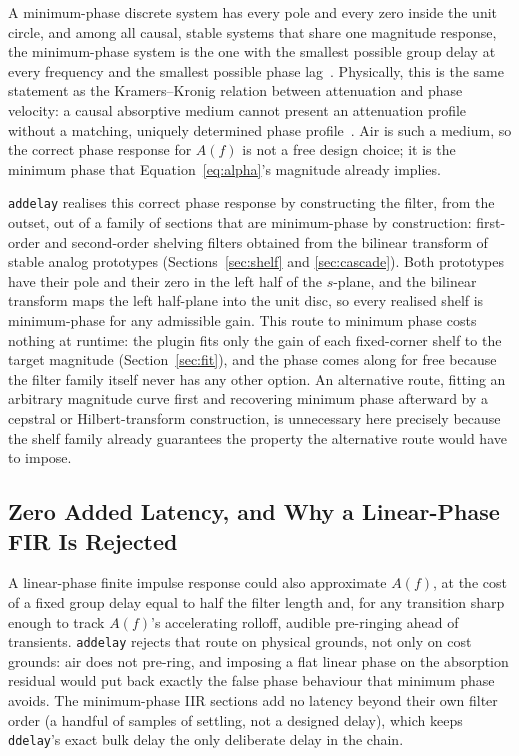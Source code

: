 \documentclass[11pt,a4paper]{article}
\begin{document}
A minimum-phase discrete system has every pole and every zero inside the unit circle, and among all causal, stable systems that share one magnitude response, the minimum-phase system is the one with the smallest possible group delay at every frequency and the smallest possible phase lag~\cite{OppenheimSchafer2010}.
Physically, this is the same statement as the Kramers--Kronig relation between attenuation and phase velocity: a causal absorptive medium cannot present an attenuation profile without a matching, uniquely determined phase profile~\cite{ODonnellJaynesMiller1981}.
Air is such a medium, so the correct phase response for $A(f)$ is not a free design choice; it is the minimum phase that Equation~\eqref{eq:alpha}'s magnitude already implies.

\texttt{addelay} realises this correct phase response by constructing the filter, from the outset, out of a family of sections that are minimum-phase by construction: first-order and second-order shelving filters obtained from the bilinear transform of stable analog prototypes (Sections~\ref{sec:shelf} and \ref{sec:cascade}).
Both prototypes have their pole and their zero in the left half of the $s$-plane, and the bilinear transform maps the left half-plane into the unit disc, so every realised shelf is minimum-phase for any admissible gain.
This route to minimum phase costs nothing at runtime: the plugin fits only the gain of each fixed-corner shelf to the target magnitude (Section~\ref{sec:fit}), and the phase comes along for free because the filter family itself never has any other option.
An alternative route, fitting an arbitrary magnitude curve first and recovering minimum phase afterward by a cepstral or Hilbert-transform construction, is unnecessary here precisely because the shelf family already guarantees the property the alternative route would have to impose.

\subsection{Zero Added Latency, and Why a Linear-Phase FIR Is Rejected}

A linear-phase finite impulse response could also approximate $A(f)$, at the cost of a fixed group delay equal to half the filter length and, for any transition sharp enough to track $A(f)$'s accelerating rolloff, audible pre-ringing ahead of transients.
\texttt{addelay} rejects that route on physical grounds, not only on cost grounds: air does not pre-ring, and imposing a flat linear phase on the absorption residual would put back exactly the false phase behaviour that minimum phase avoids.
The minimum-phase IIR sections add no latency beyond their own filter order (a handful of samples of settling, not a designed delay), which keeps \texttt{ddelay}'s exact bulk delay the only deliberate delay in the chain.
\end{document}
